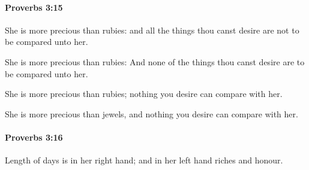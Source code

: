 		\paragraph{Proverbs 3:15} %
			\label{PROVERBS-3-15}

			She is more precious than rubies: and all the things thou canst desire are not to be compared unto her.

			\begin{versebox}
					\item[BHS] 
					\item[ASV] She is more precious than rubies: And none of the things thou canst desire are to be compared unto her.
					\item[NIV] She is more precious than rubies; nothing you desire can compare with her.
					\item[NRSV] She is more precious than jewels, and nothing you desire can compare with her.
			\end{versebox}

		\paragraph{Proverbs 3:16} %
			\label{PROVERBS-3-16}

			Length of days is in her right hand; and in her left hand riches and honour.

